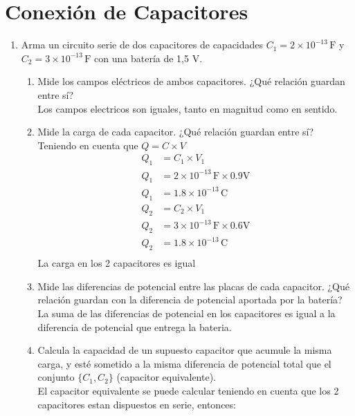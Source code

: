 \documentclass[12pt]{report}
\begin{document}
\newpage

\section{Conexión de Capacitores}

\begin{enumerate}
    \item Arma un circuito serie de dos capacitores de capacidades $C_1 = 2 \times 10^{-13} \, \text{F}$ y $C_2 = 3 \times 10^{-13} \, \text{F}$ con una batería de 1,5 V.
    \begin{enumerate}
        \item Mide los campos eléctricos de ambos capacitores. ¿Qué relación guardan entre sí?\\[6pt]
            Los campos electricos son iguales, tanto en magnitud como en sentido.\\
        \item Mide la carga de cada capacitor. ¿Qué relación guardan entre sí?\\[6pt]
            Teniendo en cuenta que $Q=C \times V$ 
            \begin{align*}
            Q_1&= C_1 \times V_1\\[6pt]
            Q_1&= 2 \times 10^{-13} \,\text{F} \times 0.9 \text{V}\\[6pt]
            Q_1&= 1.8\times 10^{-13} \,\text{C}
            \end{align*}
            \begin{align*}
            Q_2&= C_2 \times V_1\\[6pt]
            Q_2&= 3 \times 10^{-13} \,\text{F} \times 0.6 \text{V}\\[6pt]
            Q_2&= 1.8\times 10^{-13} \,\text{C}\\[12pt]
            \end{align*}
            La carga en los 2 capacitores es igual\\

        \item Mide las diferencias de potencial entre las placas de cada capacitor. ¿Qué relación guardan con la diferencia de potencial aportada por la batería?\\[6pt]
            La suma de las diferencias de potencial en los capacitores es igual a la diferencia de potencial que entrega la bateria.\\

\newpage

        \item Calcula la capacidad de un supuesto capacitor que acumule la misma carga, y esté sometido a la misma diferencia de potencial total que el conjunto $\{C_1, C_2\}$ (capacitor equivalente).\\[6pt]
            El capacitor equivalente se puede calcular teniendo en cuenta que los 2 capacitores estan dispuestos en serie, entonces:\\


\end{enumerate}
\end{enumerate}
\end{document}
